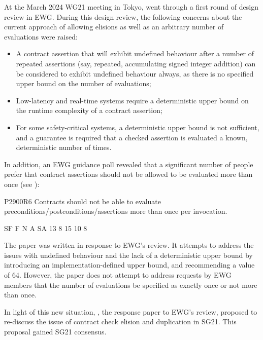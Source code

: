 At the March 2024 WG21 meeting in Tokyo, \cite{P2900R6}  went through a first round of design review in EWG. During this design review, the following concerns about the current approach of allowing elisions as well as an arbitrary number of evaluations were raised:
\begin{itemize}
\item A contract assertion that will exhibit undefined behaviour after a number of repeated assertions (say, repeated, accumulating signed integer addition) can be considered to exhibit undefined behaviour always, as there is no specified upper bound on the number of evaluations;
\item Low-latency and real-time systems require a deterministic upper bound on the runtime complexity of a contract assertion;
\item For some safety-critical systems, a deterministic upper bound is not sufficient, and a guarantee is required that a checked assertion is evaluated a known, deterministic number of times.
\end{itemize} 

In addition, an EWG guidance poll revealed that a significant number of people prefer that contract assertions should not be allowed to be evaluated more than once (see \cite{D3197R0}):

\begin{tcolorbox}[colback=green!5!white,colframe=green!75!black,title=EWG Poll 2024-03-20 (Tokyo)]
P2900R6 Contracts should not be able to evaluate preconditions/postconditions/assertions more than once per invocation.
\vspace{3mm}
\begin{codeblock}
SF F  N  A  SA
13 8  15 10 8
\end{codeblock}
\end{tcolorbox}

The paper \cite{P3119R0} was written in response to EWG's review. It attempts to address the issues with undefined behaviour and the lack of a deterministic upper bound by introducing an implementation-defined upper bound, and recommending a value of 64. However, the paper does not attempt to address requests by EWG members that the number of evaluations be specified as exactly once or not more than once.

In light of this new situation, \cite{D3197R0}, the response paper to EWG's review, proposed to re-discuss the issue of contract check elision and duplication in SG21. This proposal gained SG21 consensus.


